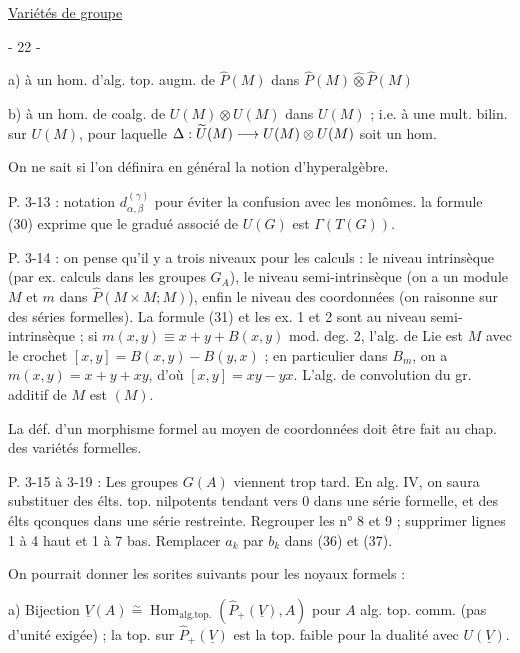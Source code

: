\uline{Variétés de groupe}
\begin{center}- 22 -\end{center}

a) à un hom. d'alg. top. augm. de $\widehat P(M)$ dans $\widehat P(M)\widehat\otimes\widehat P(M)$

b) à un hom. de coalg. de $U(M)\otimes U(M)$ dans $U(M)$ ; i.e. à une mult. bilin. sur $U(M)$, pour laquelle $\Delta:\relax{\widetilde U}(M)\longrightarrow U(M)\otimes U(M)$ soit un hom.

On ne sait si l'on définira en général la notion d'hyperalgèbre.

P. 3-13 : notation $d_{\alpha,\beta}^{(\gamma)}$ pour éviter la confusion avec les monômes. la formule (30) exprime que le gradué associé de $U(G)$ est $\Gamma(T(G))$.

P. 3-14 : on pense qu'il y a trois niveaux pour les calculs : le niveau intrinsèque (par ex. calculs  dans les groupes $G_A$), le niveau semi-intrinsèque (on a un module $M$ et $m$ dans $\widehat P(M\times M;M)$), enfin le niveau des coordonnées (on raisonne sur des séries formelles). La formule (31) et les ex. 1 et 2 sont au niveau semi-intrinsèque ; si $m(x,y)\equiv x+y+B(x,y)$ mod. deg. 2, l'alg. de Lie est $M$ avec le crochet $[x,y]=B(x,y)-B(y,x)$ ; en particulier dans $B_m$, on a $m(x,y)=x+y+xy$, d'où $[x,y]=xy-yx$. L'alg. de convolution du gr. additif de $M$ est $(M)$.

La déf. d'un morphisme formel au moyen de coordonnées doit être fait au chap. des variétés formelles.


P. 3-15 à 3-19 : Les groupes $G(A)$ viennent trop tard. En alg. IV, on saura substituer des élts. top. nilpotents tendant vers 0 dans une série formelle, et des élts qconques dans une série restreinte. Regrouper les n° 8 et 9 ; supprimer lignes 1 à 4 haut et 1 à 7 bas. Remplacer $a_k$ par $b_k$ dans (36) et (37).

On pourrait donner les sorites suivants pour les noyaux formels :

a) Bijection $\underline V(A)\overset{\sim}{=}\operatorname{Hom}_{\mathrm{alg.top.}}(\widehat P_+(\underline V),A)$ pour $A$ alg. top. comm. (pas d'unité exigée) ; la top. sur $\widehat P_+(\underline V)$ est la top. faible pour la dualité avec $U(\underline V)$.

